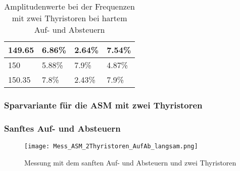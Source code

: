 \begin{appendix}
\begin{table}[ht!]
\begin{tabular}{|l|l|l|l|}
		149.65            & 6.86\%                                                                              & 2.64\%                                                                              & 7.54\%                                                                              \\ \hline
		150               & 5.88\%                                                                              & 7.9\%                                                                               & 4.87\%                                                                              \\ \hline
		150.35            & 7.8\%                                                                               & 2.43\%                                                                              & 7.9\%                                                                               \\ \hline
	\end{tabular}
	\caption{Amplitudenwerte bei der Frequenzen mit zwei Thyristoren bei hartem Auf- und Absteuern}\label{tab:Mess_2Thyristoren_Spannung_Widerstand_AufAb_hart}
\end{table}

\subsubsection{Sparvariante für die ASM mit zwei Thyristoren}

\subsubsection*{Sanftes Auf- und Absteuern}
\begin{figure}[ht!]
	\centering
	\texttt{[image: Mess\_ASM\_2Thyristoren\_AufAb\_langsam.png]}	
	\caption{Messung mit dem sanften Auf- und Absteuern und zwei Thyristoren}\label{fig:Mess_2Thyristoren_ASM_AufAbFahren_langsam}	
\end{figure}


\end{appendix}

